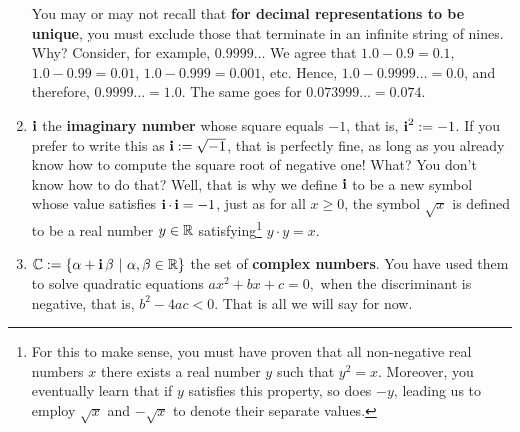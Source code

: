 \begin{tcolorbox}[colback = mylightblue, title=\textbf{Given the above as motivation, we define a set of symbols that we will frequently use in the course:}, breakable]
\begin{definition}
\begin{enumerate}
        You may or may not recall that \textbf{for decimal representations to be unique}, you must exclude those that terminate in an infinite string of nines. Why? Consider, for example, $0.9999\ldots$ We agree that $1.0-0.9 = 0.1$, $1.0-0.99 = 0.01$, $1.0-0.999 = 0.001$, etc. Hence, $1.0-0.9999\ldots = 0.0$, and therefore, $0.9999\ldots = 1.0$. The same goes for $0.073999\ldots = 0.074$. 


        \item $\mathop{\bm{\mathrm i}}$ the \textbf{imaginary number} whose square equals $-1$, that is, $\mathop{\bm{\mathrm i}}^2:=-1$. If you prefer to write this as $\mathop{\bm{\mathrm i}}:= \sqrt{-1}$, that is perfectly fine, as long as you already know how to compute the square root of negative one! What? You don't know how to do that? Well, that is why we define $\mathop{\bm{\mathrm i}}$ to be a new symbol whose value satisfies $\mathop{\bm{\mathrm i}} \cdot \mathop{\bm{\mathrm i}} = -1$, just as for all $x \ge 0$, the symbol $\sqrt{x}$ is defined to be a real number $y\in \mathbb R$ satisfying\footnote{For this to make sense, you must have proven that all non-negative real numbers $x$ there exists a real number $y$ such that $y^2=x$. Moreover, you eventually learn that if $y$ satisfies this property, so does $-y$, leading us to employ $\sqrt{x}$ and $-\sqrt{x}$ to denote their separate values.} $y \cdot y = x.$ 

        
        \item  $\mathbb{C}:= \{\alpha + \mathop{\bm{\mathrm i}} \beta ~|~ \alpha, \beta \in \mathbb R \}$ the set of \textbf{complex numbers}. You have used them to solve quadratic equations $a x^2 + bx + c = 0,$ when the discriminant is negative, that is, $b^2 - 4 ac< 0$. That is all we will say for now.
        

\end{enumerate}

 
\end{definition}
\end{tcolorbox}

\bigskip

